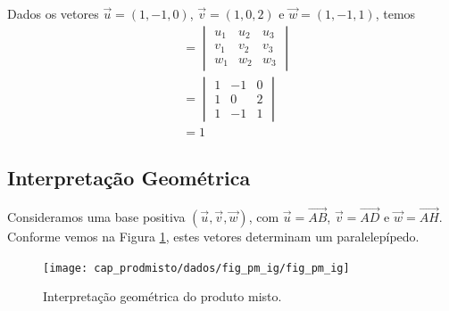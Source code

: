 \begin{ex}
  Dados os vetores $\vec{u} = (1,-1,0)$, $\vec{v} = (1,0,2)$ e $\vec{w} = (1,-1,1)$, temos
  \begin{align}
    [\vec{u},\vec{v},\vec{w}] &=
                                \begin{vmatrix}
                                  u_1 & u_2 & u_3 \\
                                  v_1 & v_2 & v_3 \\
                                  w_1 & w_2 & w_3       
                                \end{vmatrix} \\
                              &= \begin{vmatrix}
                                1 & -1 & 0 \\
                                1 & 0  & 2 \\
                                1 & -1 & 1       
                              \end{vmatrix} \\
                              &= 1
  \end{align}
\end{ex}

\subsection{Interpretação Geométrica}\label{subsec:pm_ig}

Consideramos uma base positiva $(\vec{u},\vec{v},\vec{w})$, com $\vec{u}=\overrightarrow{AB}$, $\vec{v}=\overrightarrow{AD}$ e $\vec{w}=\overrightarrow{AH}$. Conforme vemos na Figura \ref{fig:pm_ig}, estes vetores determinam um paralelepípedo.

\begin{figure}[H]
  \centering
  \texttt{[image: cap\_prodmisto/dados/fig\_pm\_ig/fig\_pm\_ig]}
  \caption{Interpretação geométrica do produto misto.}
  \label{fig:pm_ig}
\end{figure}

